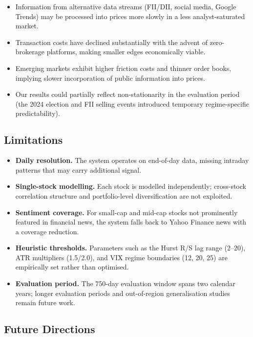 \documentclass[10pt,a4paper,twoside]{article}
\begin{document}
\begin{itemize}
\item Information from alternative data streams (FII/DII, social media,
  Google Trends) may be processed into prices more slowly in a less
  analyst-saturated market.
\item Transaction costs have declined substantially with the advent of
  zero-brokerage platforms, making smaller edges economically viable.
\item Emerging markets exhibit higher friction costs and thinner order books,
  implying slower incorporation of public information into prices.
\item Our results could partially reflect non-stationarity in the evaluation
  period (the 2024 election and FII selling events introduced temporary
  regime-specific predictability).
\end{itemize}

\subsection{Limitations}

\begin{itemize}
\item \textbf{Daily resolution.} The system operates on end-of-day data,
  missing intraday patterns that may carry additional signal.
\item \textbf{Single-stock modelling.} Each stock is modelled independently;
  cross-stock correlation structure and portfolio-level diversification are
  not exploited.
\item \textbf{Sentiment coverage.} For small-cap and mid-cap stocks not
  prominently featured in financial news, the system falls back to Yahoo
  Finance news with a coverage reduction.
\item \textbf{Heuristic thresholds.} Parameters such as the Hurst R/S lag
  range (2--20), ATR multipliers (1.5/2.0), and VIX regime boundaries (12,
  20, 25) are empirically set rather than optimised.
\item \textbf{Evaluation period.} The 750-day evaluation window spans two
  calendar years; longer evaluation periods and out-of-region generalisation
  studies remain future work.
\end{itemize}

\subsection{Future Directions}
\end{document}
